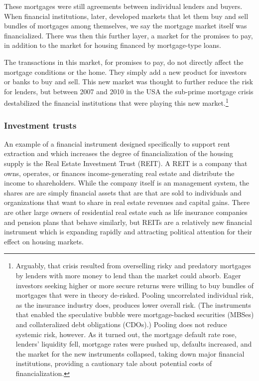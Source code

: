 These mortgages were still agreements between individual lenders and buyers. When financial institutions, later,  developed markets that let them buy and sell bundles of mortgages among themselves, we say the mortgage market itself was financialized. There was then this further layer, a market for the promises to pay, in addition to the market for housing financed by %
mortgage-type loans.

The transactions in this market, for promises to pay, do not directly affect the mortgage conditions or the home. They simply add a new product for investors or banks to buy and sell. This new market was thought to further reduce the risk for lenders, but between 2007 and 2010 in the USA the sub-prime mortgage crisis destabilized the financial institutions that were playing this new market.\footnote{Arguably, that crisis resulted from overselling risky and predatory mortgages by lenders with more money to lend than the market could absorb. Eager investors seeking higher or more secure returns were willing  to buy bundles of  mortgages that were in theory de-risked. Pooling uncorrelated individual risk, as the insurance industry does, produces lower overall risk. (The instruments that enabled the speculative bubble were mortgage-backed securities (MBSes) and collateralized debt obligations (CDOs).) Pooling does not reduce systemic risk, however. As it turned out, the mortgage default rate rose, lenders' liquidity fell, mortgage rates were pushed up, defaults increased, and the market for the new instruments collapsed, taking down major financial institutions, providing a cautionary tale about potential costs of financialization.} %

\subsubsection{Investment trusts}
An example of a financial instrument designed specifically to support rent extraction and which increases the degree of financialization of the housing supply is the Real Estate Investment Trust (\gls{REIT}).  A REIT is a company that owns, operates, or finances income-generating real estate and distribute the income to shareholders. While the company itself is an management system, the shares are are simply financial assets that are that are sold to individuals and organizations that want to share in real estate revenues and capital gains. There are other large owners of residential real estate such as life insurance companies and pension plans that behave similarly, but REITs are a relatively new financial instrument which is  expanding rapidly and attracting political attention for their effect on housing markets.  %

